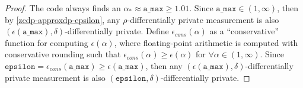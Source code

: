 \documentclass{article}
\begin{document}
\begin{proof}
The code always finds an $\alpha_{*} \approx \texttt{a\_max} \geq 1.01$.
Since $\texttt{a\_max} \in (1, \infty)$, then by \ref{zcdp-approxdp-epsilon}, any $\rho$-differentially private measurement is also $(\epsilon(\texttt{a\_max}), \delta)$-differentially private.
Define $\epsilon_{cons}(\alpha)$ as a ``conservative'' function for computing $\epsilon(\alpha)$, 
where floating-point arithmetic is computed with conservative rounding such that $\epsilon_{cons}(\alpha) \geq \epsilon(\alpha)$ for $\forall \alpha \in (1, \infty)$.
Since $\texttt{epsilon} = \epsilon_{cons}(\texttt{a\_max}) \geq \epsilon(\texttt{a\_max})$, then any $(\epsilon(\texttt{a\_max}), \delta)$-differentially private measurement is also $(\texttt{epsilon}, \delta)$-differentially private.
\end{proof}




\end{document}
